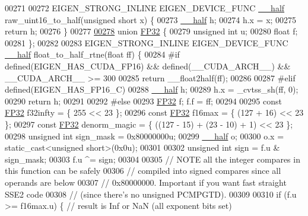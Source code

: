 \begin{DoxyCode}
00271 
00272 EIGEN\_STRONG\_INLINE EIGEN\_DEVICE\_FUNC \hyperlink{struct_eigen_1_1half__impl_1_1____half}{\_\_half} raw\_uint16\_to\_half(\textcolor{keywordtype}{unsigned} \textcolor{keywordtype}{short} x) \{
00273   \hyperlink{struct_eigen_1_1half__impl_1_1____half}{\_\_half} h;
00274   h.x = x;
00275   \textcolor{keywordflow}{return} h;
00276 \}
00277 
\hyperlink{union_eigen_1_1half__impl_1_1_f_p32}{00278} \textcolor{keyword}{union }\hyperlink{union_eigen_1_1half__impl_1_1_f_p32}{FP32} \{
00279   \textcolor{keywordtype}{unsigned} \textcolor{keywordtype}{int} u;
00280   \textcolor{keywordtype}{float} f;
00281 \};
00282 
00283 EIGEN\_STRONG\_INLINE EIGEN\_DEVICE\_FUNC \hyperlink{struct_eigen_1_1half__impl_1_1____half}{\_\_half} float\_to\_half\_rtne(\textcolor{keywordtype}{float} ff) \{
00284 \textcolor{preprocessor}{#if defined(EIGEN\_HAS\_CUDA\_FP16) && defined(\_\_CUDA\_ARCH\_\_) && \_\_CUDA\_ARCH\_\_ >= 300}
00285   \textcolor{keywordflow}{return} \_\_float2half(ff);
00286 
00287 \textcolor{preprocessor}{#elif defined(EIGEN\_HAS\_FP16\_C)}
00288   \hyperlink{struct_eigen_1_1half__impl_1_1____half}{\_\_half} h;
00289   h.x = \_cvtss\_sh(ff, 0);
00290   \textcolor{keywordflow}{return} h;
00291 
00292 \textcolor{preprocessor}{#else}
00293   \hyperlink{union_eigen_1_1half__impl_1_1_f_p32}{FP32} f; f.f = ff;
00294 
00295   \textcolor{keyword}{const} \hyperlink{union_eigen_1_1half__impl_1_1_f_p32}{FP32} f32infty = \{ 255 << 23 \};
00296   \textcolor{keyword}{const} \hyperlink{union_eigen_1_1half__impl_1_1_f_p32}{FP32} f16max = \{ (127 + 16) << 23 \};
00297   \textcolor{keyword}{const} \hyperlink{union_eigen_1_1half__impl_1_1_f_p32}{FP32} denorm\_magic = \{ ((127 - 15) + (23 - 10) + 1) << 23 \};
00298   \textcolor{keywordtype}{unsigned} \textcolor{keywordtype}{int} sign\_mask = 0x80000000u;
00299   \hyperlink{struct_eigen_1_1half__impl_1_1____half}{\_\_half} o;
00300   o.x = \textcolor{keyword}{static\_cast<}\textcolor{keywordtype}{unsigned} \textcolor{keywordtype}{short}\textcolor{keyword}{>}(0x0u);
00301 
00302   \textcolor{keywordtype}{unsigned} \textcolor{keywordtype}{int} sign = f.u & sign\_mask;
00303   f.u ^= sign;
00304 
00305   \textcolor{comment}{// NOTE all the integer compares in this function can be safely}
00306   \textcolor{comment}{// compiled into signed compares since all operands are below}
00307   \textcolor{comment}{// 0x80000000. Important if you want fast straight SSE2 code}
00308   \textcolor{comment}{// (since there's no unsigned PCMPGTD).}
00309 
00310   \textcolor{keywordflow}{if} (f.u >= f16max.u) \{  \textcolor{comment}{// result is Inf or NaN (all exponent bits set)}

\end{DoxyCode}

